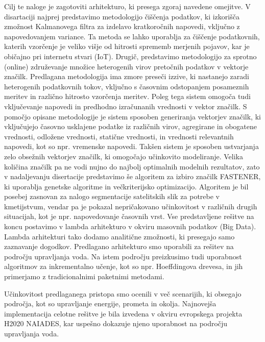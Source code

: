 Cilj te naloge je zagotoviti arhitekturo, ki presega zgoraj navedene omejitve. 
V disartaciji najprej predstavimo metodologijo čiščenja podatkov, ki izkorišča zmožnost Kalmanovega filtra za izdelavo kratkoročnih napovedi, vključno z napovedovanjem variance. 
Ta metoda se lahko uporablja za čiščenje podatkovnih, katerih vzorčenje je veliko višje od hitrosti sprememb merjenih pojavov, kar je običajno pri internetu stvari (IoT). 
Drugič, predstavimo metodologijo za sprotno (online) združevanje množice heterogenih virov pretočnih podatkov v vektorje značilk. 
Predlagana metodologija ima zmore preseči izzive, ki nastanejo zaradi heterogenih podatkovnih tokov, vključno s časovnim odstopanjem posameznih meritev in različno hitrosto vzorčenja meritev. 
Poleg tega sistem omogoča tudi vključevanje napovedi in predhodno izračunanih vrednosti v vektor značilk. 
S pomočjo opisane metodologije je sistem sposoben generiranja vektorjev značilk, ki vključujejo časovno usklajene podatke iz različnih virov, agregirane in obogatene vrednosti, odložene vrednosti, statične vrednosti, in vrednosti relevantnih napovedi, kot so npr. vremenske napovedi. 
Takšen sistem je sposoben ustvarjanja zelo obsežnih vektorjev značilk, ki omogočajo učinkovito modeliranje.
Velika količina značilk pa ne vodi nujno do najbolj optimalnih modelnih rezultatov, zato v nadaljevanju disertacije predstavimo še algoritem za izbiro značilk FASTENER, ki uporablja genetske algoritme in večkriterijsko optimizacijo. 
Algoritem je bil posebej zasnovan za nalogo segmentacije satelitskih slik za potrebe v kmetijstvum, vendar pa je pokazal nepričakovano učinkovitost v različnih drugih situacijah, kot je npr. napovedovanje časovnih vrst. 
Vse predstavljene rešitve na koncu postavimo v lambda arhitekturo v okviru masovnih podatkov (Big Data).
Lambda arhitekturi tako dodamo analitične zmožnosti, ki presegajo samo zaznavanje dogodkov.
Predlagano arhitekturo smo uporabili za rešitev na področju upravljanja voda. 
Na istem področju preizkusimo tudi uporabnost algoritmov za inkrementalno učenje, kot so npr. Hoeffdingova drevesa, in jih primerjamo z tradicionalnimi paketnimi metodami.

Učinkovitost predlaganega pristopa smo ocenili v več scenarijih, ki obsegajo področja, kot so upravljanje energije, prometa in okolja. 
Najnovejša implementacija celotne rešitve je bila izvedena v okviru evropskega projekta H2020 NAIADES, kar uspešno dokazuje njeno uporabnost na področju upravljanja voda.